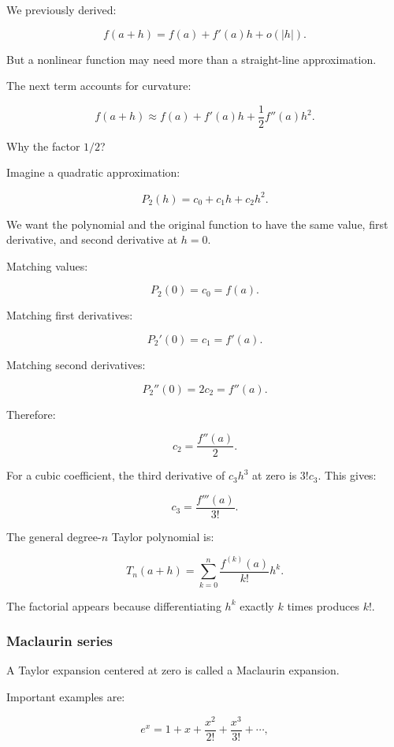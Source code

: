 \hypertarget{02-foundations-ii-ch021-taylor-series-in-one-variable}{}

We previously derived:

\[
f(a+h)=f(a)+f'(a)h+o(|h|).
\]

But a nonlinear function may need more than a straight-line approximation.

The next term accounts for curvature:

\[
f(a+h)\approx f(a)+f'(a)h+\frac12f''(a)h^2.
\]

Why the factor \(1/2\)?

Imagine a quadratic approximation:

\[
P_2(h)=c_0+c_1h+c_2h^2.
\]

We want the polynomial and the original function to have the same value, first derivative, and second derivative at \(h=0\).

Matching values:

\[
P_2(0)=c_0=f(a).
\]

Matching first derivatives:

\[
P_2'(0)=c_1=f'(a).
\]

Matching second derivatives:

\[
P_2''(0)=2c_2=f''(a).
\]

Therefore:

\[
c_2=\frac{f''(a)}2.
\]

For a cubic coefficient, the third derivative of \(c_3h^3\) at zero is \(3!c_3\). This gives:

\[
c_3=\frac{f'''(a)}{3!}.
\]

The general degree-\(n\) Taylor polynomial is:

\[
\boxed{ T_n(a+h)= \sum_{k=0}^{n} \frac{f^{(k)}(a)}{k!}h^k }.
\]

The factorial appears because differentiating \(h^k\) exactly \(k\) times produces \(k!\).

\subsubsection{Maclaurin series}\label{02-foundations-ii-ch021-maclaurin-series}

\hypertarget{02-foundations-ii-ch021-maclaurin-series}{}

A Taylor expansion centered at zero is called a Maclaurin expansion.

Important examples are:

\[
e^x= 1+x+\frac{x^2}{2!}+\frac{x^3}{3!}+\cdots,
\]

